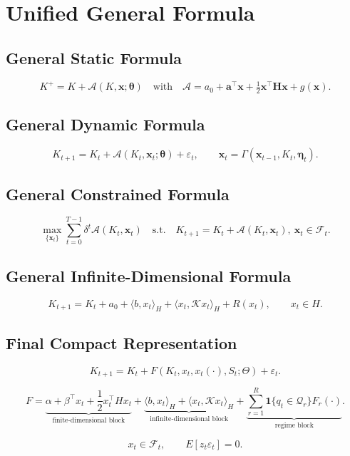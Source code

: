 \documentclass[11pt]{article}
\begin{document}
\section{Unified General Formula}

\subsection{General Static Formula}
\[
K^+=K+\mathcal{A}(K,\bm{x};\bm{\theta})
\quad\text{with}\quad
\mathcal{A}=a_0+\bm{a}^\top\bm{x}+\tfrac12\bm{x}^\top\bm{H}\bm{x}+g(\bm{x}).
\]

\subsection{General Dynamic Formula}
\[
K_{t+1}=K_t+\mathcal{A}(K_t,\bm{x}_t;\bm{\theta})+\varepsilon_t,
\qquad \bm{x}_t=\Gamma(\bm{x}_{t-1},K_t,\bm{\eta}_t).
\]

\subsection{General Constrained Formula}
\[
\max_{\{\bm{x}_t\}}\sum_{t=0}^{T-1}\delta^t\mathcal{A}(K_t,\bm{x}_t)
\quad\text{s.t.}\quad K_{t+1}=K_t+\mathcal{A}(K_t,\bm{x}_t),\ \bm{x}_t\in\mathcal{F}_t.
\]

\subsection{General Infinite-Dimensional Formula}

\[
K_{t+1}
=
K_t+a_0+\langle b,x_t\rangle_H
+\langle x_t,\mathcal Kx_t\rangle_H
+R(x_t),
\qquad
x_t\in H.
\]

\subsection{Final Compact Representation}

\[
K_{t+1}
=
K_t
+
F(K_t,x_t,x_t(\cdot),S_t;\Theta)
+
\varepsilon_t.
\]

\[
F
=
\underbrace{
\alpha+\beta^\top x_t+\frac12x_t^\top Hx_t
}_{\text{finite-dimensional block}}
+
\underbrace{
\langle b,x_t\rangle_H+\langle x_t,\mathcal Kx_t\rangle_H
}_{\text{infinite-dimensional block}}
+
\underbrace{
\sum_{r=1}^{R}\mathbf 1\{q_t\in\mathcal Q_r\}F_r(\cdot)
}_{\text{regime block}}.
\]

\[
x_t\in\mathcal F_t,
\qquad
E[z_t\varepsilon_t]=0.
\]
\end{document}
